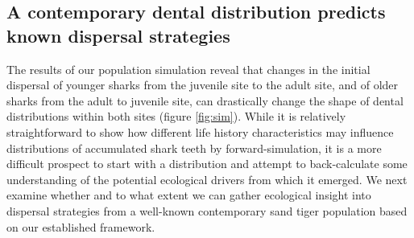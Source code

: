 \documentclass[]{rsos}%
\begin{document}




\subsection{A contemporary dental distribution predicts known dispersal strategies}

The results of our population simulation reveal that changes in the initial dispersal of younger sharks from the juvenile site to the adult site, and of older sharks from the adult to juvenile site, can drastically change the shape of dental distributions within both sites (figure \ref{fig:sim}).
While it is relatively straightforward to show how different life history characteristics may influence distributions of accumulated shark teeth by forward-simulation, it is a more difficult prospect to start with a distribution and attempt to back-calculate some understanding of the potential ecological drivers from which it emerged.
We next examine whether and to what extent we can gather ecological insight into dispersal strategies from a well-known contemporary sand tiger population based on our established framework.
\end{document}
